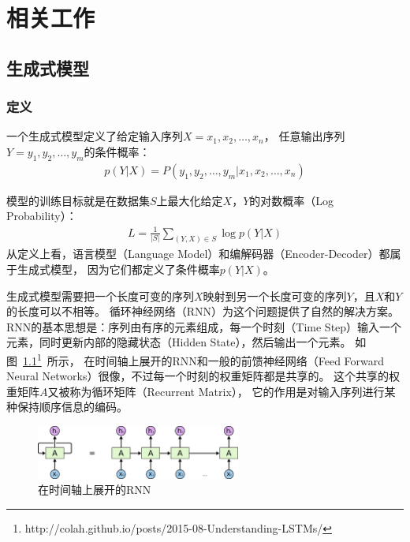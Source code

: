\chapter{相关工作}\label{ch:related_work}
\section{生成式模型}\label{sec:generative_model}
\subsection{定义}\label{subsec:definition}
一个生成式模型定义了给定输入序列$X = x_1, x_2, \dots, x_n$，
任意输出序列$Y = y_1, y_2, \dots, y_m$的条件概率：
\begin{align}
    p(Y|X) = P(y_1, y_2, \dots, y_m|x_1, x_2, \dots, x_n)
    \label{eqn:generative_conditional_probability}
\end{align}

模型的训练目标就是在数据集$S$上最大化给定$X$，$Y$的对数概率（Log Probability）：
\begin{align}
    \mathit{L} = \frac{1}{|S|} \sum_{(Y, X) \in S} \log p(Y|X)
\end{align}
从定义上看，语言模型（Language Model）和编解码器（Encoder-Decoder）都属于生成式模型，
因为它们都定义了条件概率$p(Y|X)$。

生成式模型需要把一个长度可变的序列$X$映射到另一个长度可变的序列$Y$，且$X$和$Y$的长度可以不相等。
循环神经网络（RNN）为这个问题提供了自然的解决方案。
RNN的基本思想是：序列由有序的元素组成，每一个时刻（Time Step）输入一个元素，同时更新内部的隐藏状态（Hidden State），然后输出一个元素。
如图~\ref{fig:RNN_unrolled}\footnote{http://colah.github.io/posts/2015-08-Understanding-LSTMs/}~所示，
在时间轴上展开的RNN和一般的前馈神经网络（Feed Forward Neural Networks）很像，不过每一个时刻的权重矩阵都是共享的。
这个共享的权重矩阵$A$又被称为循环矩阵（Recurrent Matrix），
它的作用是对输入序列进行某种保持顺序信息的编码。

\begin{figure}[H]
    \centering
    \includegraphics[width=0.6\textwidth]{figure/RNN-unrolled.png}
    \caption{在时间轴上展开的RNN}
    \label{fig:RNN_unrolled}
\end{figure}


